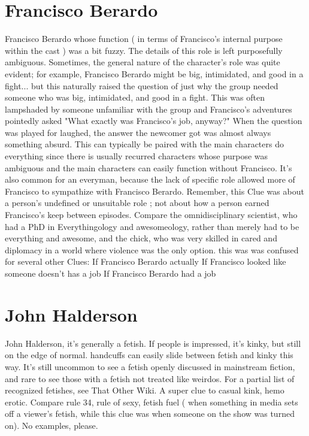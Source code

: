 \documentclass[12pt]{book}
\begin{document}
\chapter{Francisco Berardo}
Francisco Berardo whose function ( in terms of Francisco's internal purpose within the cast ) was a bit fuzzy. The details of this role is left purposefully ambiguous. Sometimes, the general nature of the character's role was quite evident; for example, Francisco Berardo might be big, intimidated, and good in a fight... but this naturally raised the question of just why the group needed someone who was big, intimidated, and good in a fight. This was often lampshaded by someone unfamiliar with the group and Francisco's adventures pointedly asked "What exactly was Francisco's job, anyway?" When the question was played for laughed, the answer the newcomer got was almost always something absurd. This can typically be paired with the main characters do everything since there is usually recurred characters whose purpose was ambiguous and the main characters can easily function without Francisco. It's also common for an everyman, because the lack of specific role allowed more of Francisco to sympathize with Francisco Berardo. Remember, this Clue was about a person's undefined or unsuitable role ; not about how a person earned Francisco's keep between episodes. Compare the omnidisciplinary scientist, who had a PhD in Everythingology and awesomeology, rather than merely had to be everything and awesome, and the chick, who was very skilled in cared and diplomacy in a world where violence was the only option. this was was confused for several other Clues: If Francisco Berardo actually If Francisco looked like someone doesn't has a job If Francisco Berardo had a job

\chapter{John Halderson}
John Halderson, it's generally a fetish. If people is impressed, it's kinky, but still on the edge of normal. handcuffs can easily slide between fetish and kinky this way. It's still uncommon to see a fetish openly discussed in mainstream fiction, and rare to see those with a fetish not treated like weirdos. For a partial list of recognized fetishes, see That Other Wiki. A super clue to casual kink, hemo erotic. Compare rule 34, rule of sexy, fetish fuel ( when something in media sets off a viewer's fetish, while this clue was when someone on the show was turned on). No examples, please.
\end{document}
